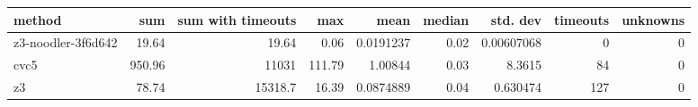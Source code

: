 \begin{tabular}{lrrrrrrrr}
\hline
 method             &    sum &   sum with timeouts &    max &      mean &   median &   std. dev &   timeouts &   unknowns \\
\hline
 z3-noodler-3f6d642 &  19.64 &               19.64 &   0.06 & 0.0191237 &     0.02 & 0.00607068 &          0 &          0 \\
 cvc5               & 950.96 &            11031    & 111.79 & 1.00844   &     0.03 & 8.3615     &         84 &          0 \\
 z3                 &  78.74 &            15318.7  &  16.39 & 0.0874889 &     0.04 & 0.630474   &        127 &          0 \\
\hline
\end{tabular}
